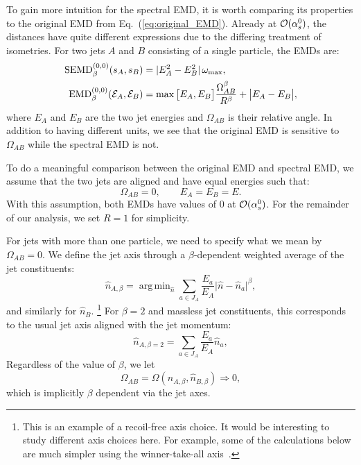\documentclass[letterpaper,11pt]{article}
\DeclareMathOperator*{\argmin}{arg\,min}
\DeclareRobustCommand{\Eq}[1]{Eq.~(\ref{#1})}
\begin{document}
To gain more intuition for the spectral EMD, it is worth comparing its properties to the original EMD from \Eq{eq:original_EMD}.
%
Already at ${\cal O}(\alpha_s^0)$, the distances have quite different expressions due to the differing treatment of isometries.
%
For two jets $A$ and $B$ consisting of a single particle, the EMDs are:
%
\begin{align}
\text{SEMD}^{(0,0)}_{\beta}(s_A, s_B) &= |E_A^2-E_B^2|\,\omega_{\max},\\
\text{EMD}^{(0,0)}_{\beta}({\cal E}_A,{\cal E}_B) &= \max\big[E_A,E_B\big] \frac{\Omega_{AB}^\beta}{R^\beta} + \big| E_A - E_B \big|,
\end{align}
%
where $E_A$ and $E_B$ are the two jet energies and $\Omega_{AB}$ is their relative angle.
%
In addition to having different units, we see that the original EMD is sensitive to $\Omega_{AB}$ while the spectral EMD is not.


To do a meaningful comparison between the original EMD and spectral EMD, we assume that the two jets are aligned and have equal energies such that:
%
\begin{equation}
\Omega_{AB} = 0, \qquad E_A = E_B = E.
\end{equation}
%
With this assumption, both EMDs have values of $0$ at ${\cal O}(\alpha_s^0)$.
%
For the remainder of our analysis, we set $R = 1$ for simplicity.



For jets with more than one particle, we need to specify what we mean by $\Omega_{AB} = 0$.
%
We define the jet axis through a $\beta$-dependent weighted average of the jet constituents:
%
\begin{equation}
\label{eq:jet_axis}
\hat n_{A,\beta} = \argmin_{\hat{n}} \sum_{a \in J_A} \frac{E_a}{E_A} \big| \hat n - \hat{n}_a \big|^\beta,
\end{equation}
%
and similarly for $\hat n_B$.%
%
\footnote{This is an example of a recoil-free axis choice.  It would be interesting to study different axis choices here.  For example, some of the calculations below are much simpler using the winner-take-all axis~\cite{gavinwta,Bertolini:2013iqa,Larkoski:2014uqa}.}
%
For $\beta = 2$ and massless jet constituents, this corresponds to the usual jet axis aligned with the jet momentum:
%
\begin{equation}
\hat n_{A,\beta=2} =  \sum_{a \in J_A} \frac{E_a}{E_A} \hat{n}_a,
\end{equation}
%
Regardless of the value of $\beta$, we let
%
\begin{equation}
\label{eq:OmegaAB_align}
\Omega_{AB} = \Omega(\hat n_{A,\beta}, \hat n_{B,\beta}) \Rightarrow 0,
\end{equation}
%
which is implicitly $\beta$ dependent via the jet axes.
\end{document}
